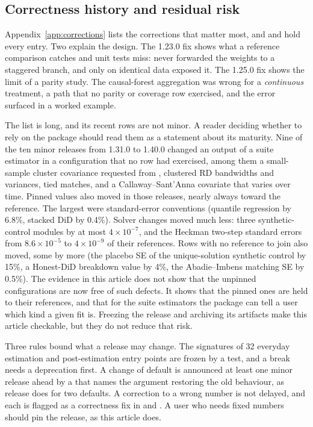 \subsection{Correctness history and residual risk}\label{sec:parity-gaps}

Appendix~\ref{app:corrections} lists the corrections that matter most, and
 and  hold every entry. Two explain the
design. The 1.23.0 fix shows what a reference comparison catches and unit
tests miss:  never forwarded the weights to a
staggered branch, and only  on identical
data exposed it. The 1.25.0 fix shows the limit of a parity study. The
causal-forest aggregation was wrong for a \emph{continuous} treatment, a
path that no parity or coverage row exercised, and the error surfaced in a
worked example.

The list is long, and its recent rows are not minor. A reader deciding
whether to rely on the package should read them as a statement about its
maturity. Nine of the ten minor releases from 1.31.0 to 1.40.0 changed an
output of a suite estimator in a configuration that no row had exercised,
among them a small-sample cluster covariance requested from ,
clustered RD bandwidths and variances, tied matches, and a
Callaway--Sant'Anna covariate that varies over time. Pinned values also moved
in those releases, nearly always toward the reference. The largest were
standard-error conventions (quantile regression by 6.8\%, stacked DiD by 0.4\%). Solver
changes moved much less: three synthetic-control modules by at most
\(4\times10^{-7}\), and the Heckman two-step standard errors from
\(8.6\times10^{-5}\) to \(4\times10^{-9}\) of their references. Rows
with no reference to join also moved, some by more (the placebo SE of the unique-solution synthetic control by
15\%, a Honest-DiD breakdown value by 4\%, the Abadie--Imbens matching SE by
0.5\%). The evidence
in this article does not show that the unpinned configurations are now free
of such defects. It shows that the pinned ones are held to their references,
and that for the suite estimators the package can tell a user which kind a
given fit is. Freezing the release and archiving its artifacts make this
article checkable, but they do not reduce that risk.
\label{sec:convention-gaps}

Three rules bound what a release may change. The signatures of 32 everyday
estimation and post-estimation entry points are frozen by a test, and a break
needs a deprecation first. A change of default is announced at least one minor
release ahead by a  that names the argument restoring the
old behaviour, as release \StatsPAIVersion{} does for two defaults. A
correction to a wrong number is not delayed, and each is flagged as a
correctness fix in  and . A user who
needs fixed numbers should pin the release, as this article does.
